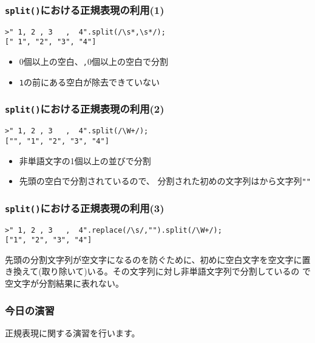 \iffalse\else
\begin{frame}[containsverbatim]
\frametitle{\protect\texttt{split()}における正規表現の利用(1)}
\begin{Verbatim}
>" 1, 2 , 3   ,  4".split(/\s*,\s*/);
[" 1", "2", "3", "4"]
\end{Verbatim}
\begin{itemize}
 \item $0$個以上の空白、\Verb+,+$0$個以上の空白で分割
 \item \Verb+1+の前にある空白が除去できていない
\end{itemize} 
\end{frame}
\fi
\iffalse\else
\begin{frame}[containsverbatim]
\frametitle{\protect\texttt{split()}における正規表現の利用(2)}
\begin{Verbatim}
>" 1, 2 , 3   ,  4".split(/\W+/);
["", "1", "2", "3", "4"]
\end{Verbatim}
\begin{itemize}
 \item 非単語文字の1個以上の並びで分割
 \item 先頭の空白で分割されているので、
 分割された初めの文字列はから文字列\Verb+""+
\end{itemize}
\end{frame}
\begin{frame}[containsverbatim]
\frametitle{\protect\texttt{split()}における正規表現の利用(3)}
\begin{Verbatim}
>" 1, 2 , 3   ,  4".replace(/\s/,"").split(/\W+/);
["1", "2", "3", "4"]
\end{Verbatim}
先頭の分割文字列が空文字になるのを防ぐために、初めに空白文字を空文字に置
 き換えて(取り除いて)いる。その文字列に対し非単語文字列で分割しているの
 で空文字が分割結果に表れない。
\end{frame}
\fi
\begin{frame}[containsverbatim]
 \frametitle{今日の演習}
正規表現に関する演習を行います。
\end{frame}



